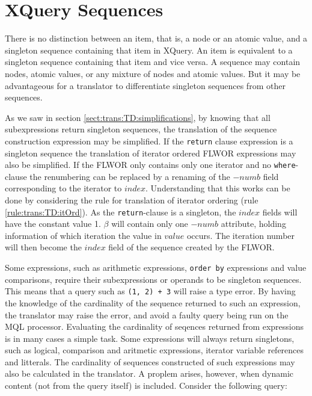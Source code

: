 \section{XQuery Sequences}
\label{sect:disc:singelton}

There is no distinction between an item, that is, a node or an atomic value, and a singleton sequence containing
that item in XQuery. An item is equivalent to a singleton sequence containing that item and vice versa. A sequence
may contain nodes, atomic values, or any mixture of nodes and atomic values. But it may be advantageous for a
translator to differentiate singleton sequences from other sequences. 

As we saw in section \ref{sect:trans:TD:simplifications}, by knowing that all subexpressions return singleton
sequences, the translation of the sequence construction expression may be simplified. If the \texttt{return}
clause expression is a singleton sequence the translation of iterator ordered FLWOR expressions may also be
simplified. If the FLWOR only contains only one iterator and no \texttt{where}-clause the renumbering can be
replaced by a renaming of the $-numb$ field corresponding to the iterator to $index$. Understanding that this
works can be done by considering the rule for translation of iterator ordering (rule \ref{rule:trans:TD:itOrd}).
As the \texttt{return}-clause is a singleton, the $index$ fields will have the constant value 1. $\beta$ will
contain only one $-numb$ attribute, holding information of which iteration the value in $value$ occurs. The
iteration number will then become the $index$ field of the sequence created by the FLWOR.

Some expressions, such as arithmetic expressions, \texttt{order by} expressions and value comparisons, require
their subexpressions or operands to be singleton sequences. This means that a query such as \texttt{(1, 2) + 3}
will raise a type error. By having the knowledge of the cardinality of the sequence returned to such an
expression, the translator may raise the error, and avoid a faulty query being run on the MQL processor.
Evaluating the cardinality of seqences returned from expressions is in many cases a simple task. Some expressions
will always return singletons, such as logical, comparison and aritmetic expressions, iterator variable references
and litterals. The cardinality of sequences constructed of such expressions may also be calculated in the
translator. A proplem arises, however, when dynamic content (not from the query itself) is included. Consider the
following query:

